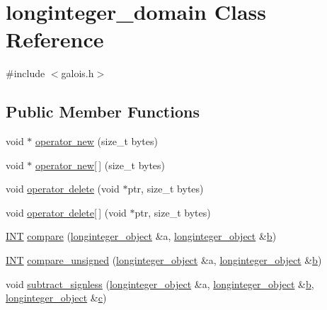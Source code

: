 \hypertarget{classlonginteger__domain}{}\section{longinteger\+\_\+domain Class Reference}
\label{classlonginteger__domain}


{\ttfamily \#include $<$galois.\+h$>$}

\subsection*{Public Member Functions}
\begin{DoxyCompactItemize}
\item 
void $\ast$ \mbox{\hyperlink{classlonginteger__domain_a3564d579577df34e14b5f85f8b9d8f66}{operator new}} (size\+\_\+t bytes)
\item 
void $\ast$ \mbox{\hyperlink{classlonginteger__domain_acf1cf966d44cec923345c1a9fa7ac410}{operator new\mbox{[}$\,$\mbox{]}}} (size\+\_\+t bytes)
\item 
void \mbox{\hyperlink{classlonginteger__domain_a74a0a83708b6508be09dda83f62c86a3}{operator delete}} (void $\ast$ptr, size\+\_\+t bytes)
\item 
void \mbox{\hyperlink{classlonginteger__domain_a52daeb957f1dca4df6d488b005bfc15b}{operator delete\mbox{[}$\,$\mbox{]}}} (void $\ast$ptr, size\+\_\+t bytes)
\item 
\mbox{\hyperlink{galois_8h_a09fddde158a3a20bd2dcadb609de11dc}{I\+NT}} \mbox{\hyperlink{classlonginteger__domain_a6780a80b91bf044dde737578b2e19a02}{compare}} (\mbox{\hyperlink{classlonginteger__object}{longinteger\+\_\+object}} \&a, \mbox{\hyperlink{classlonginteger__object}{longinteger\+\_\+object}} \&\mbox{\hyperlink{alphabet2_8_c_a148e3876077787926724625411d6e7a9}{b}})
\item 
\mbox{\hyperlink{galois_8h_a09fddde158a3a20bd2dcadb609de11dc}{I\+NT}} \mbox{\hyperlink{classlonginteger__domain_ad4328779ebda00cbf85f5bddcc1a125f}{compare\+\_\+unsigned}} (\mbox{\hyperlink{classlonginteger__object}{longinteger\+\_\+object}} \&a, \mbox{\hyperlink{classlonginteger__object}{longinteger\+\_\+object}} \&\mbox{\hyperlink{alphabet2_8_c_a148e3876077787926724625411d6e7a9}{b}})
\item 
void \mbox{\hyperlink{classlonginteger__domain_ae3c122c0ba79ac3bf90bf8dbdd245826}{subtract\+\_\+signless}} (\mbox{\hyperlink{classlonginteger__object}{longinteger\+\_\+object}} \&a, \mbox{\hyperlink{classlonginteger__object}{longinteger\+\_\+object}} \&\mbox{\hyperlink{alphabet2_8_c_a148e3876077787926724625411d6e7a9}{b}}, \mbox{\hyperlink{classlonginteger__object}{longinteger\+\_\+object}} \&\mbox{\hyperlink{alphabet2_8_c_a4e1e0e72dd773439e333c84dd762a9c3}{c}})

\end{DoxyCompactItemize}
